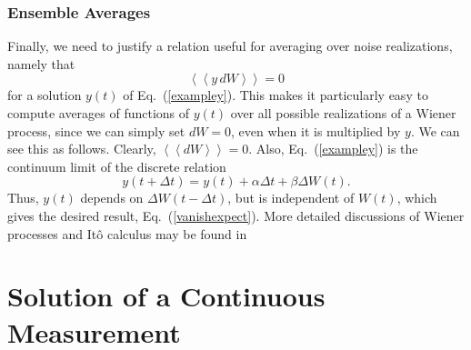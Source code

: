 \documentclass[aps,twocolumn,superscriptaddress,footinbib,floatfix,showpacs]{revtex4}
\newcommand{\dlangle}{\left\langle\!\left\langle}
\newcommand{\drangle}{\right\rangle\!\right\rangle}
\def\dexpct#1{\dlangle{#1}\drangle}
\begin{document}
\subsubsection{Ensemble Averages}
\label{section:ensembleaveragees}

Finally, we need to justify a relation useful for averaging over
noise realizations, namely that
\begin{equation}
  \dexpct{y\,dW}=0
  \label{vanishexpect}
\end{equation} 
for a solution $y(t)$ of Eq.~(\ref{exampley}). This makes it particularly 
easy to compute averages of functions of $y(t)$ over all possible 
realizations of a Wiener process, 
since we can simply set $dW=0$, even when it is multiplied 
by $y$.  We can see this as follows. Clearly, $\dexpct{dW}=0$. Also, 
Eq.~(\ref{exampley}) is the continuum limit of the discrete relation
\begin{equation}
  y(t+\Delta t) = y(t) +  \alpha\Delta t + \beta\Delta W(t).
\end{equation}
Thus, $y(t)$ depends on $\Delta W(t-\Delta t)$, but is
independent of $W(t)$, which gives the desired result,
Eq.~(\ref{vanishexpect}).  More detailed discussions of Wiener 
processes and It\^o calculus may be found in~\cite{WienerIntroPaper,gardiner}




\section{Solution of a Continuous Measurement}
\label{section:solution}
\end{document}
